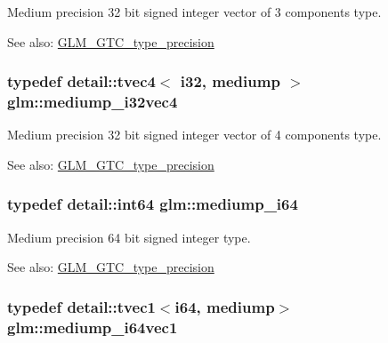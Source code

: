Medium precision 32 bit signed integer vector of 3 components type. \begin{Desc}
\item[See also:]\hyperlink{group__gtc__type__precision}{GLM\_\-GTC\_\-type\_\-precision} \end{Desc}
\hypertarget{group__gtc__type__precision_g68126328090f37655d8218c5a5fb8ae5}{
\subsubsection[mediump\_\-i32vec4]{\setlength{\rightskip}{0pt plus 5cm}typedef detail::tvec4$<$ i32, mediump $>$ {\bf glm::mediump\_\-i32vec4}}}
\label{group__gtc__type__precision_g68126328090f37655d8218c5a5fb8ae5}


Medium precision 32 bit signed integer vector of 4 components type. \begin{Desc}
\item[See also:]\hyperlink{group__gtc__type__precision}{GLM\_\-GTC\_\-type\_\-precision} \end{Desc}
\hypertarget{group__gtc__type__precision_g90fedf6c701ffbe00535156715e50787}{
\subsubsection[mediump\_\-i64]{\setlength{\rightskip}{0pt plus 5cm}typedef detail::int64 {\bf glm::mediump\_\-i64}}}
\label{group__gtc__type__precision_g90fedf6c701ffbe00535156715e50787}


Medium precision 64 bit signed integer type. \begin{Desc}
\item[See also:]\hyperlink{group__gtc__type__precision}{GLM\_\-GTC\_\-type\_\-precision} \end{Desc}
\hypertarget{group__gtc__type__precision_gd2423a91c791b9ca2f8a3ecfc71b080d}{
\subsubsection[mediump\_\-i64vec1]{\setlength{\rightskip}{0pt plus 5cm}typedef detail::tvec1$<$i64, mediump$>$ {\bf glm::mediump\_\-i64vec1}}}
\label{group__gtc__type__precision_gd2423a91c791b9ca2f8a3ecfc71b080d}


